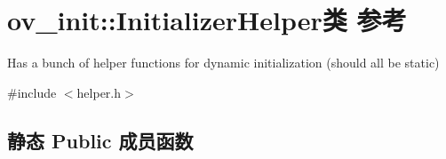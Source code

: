 \hypertarget{classov__init_1_1InitializerHelper}{}\section{ov\+\_\+init\+:\+:Initializer\+Helper类 参考}
\label{classov__init_1_1InitializerHelper}


Has a bunch of helper functions for dynamic initialization (should all be static)  




{\ttfamily \#include $<$helper.\+h$>$}

\subsection*{静态 Public 成员函数}
